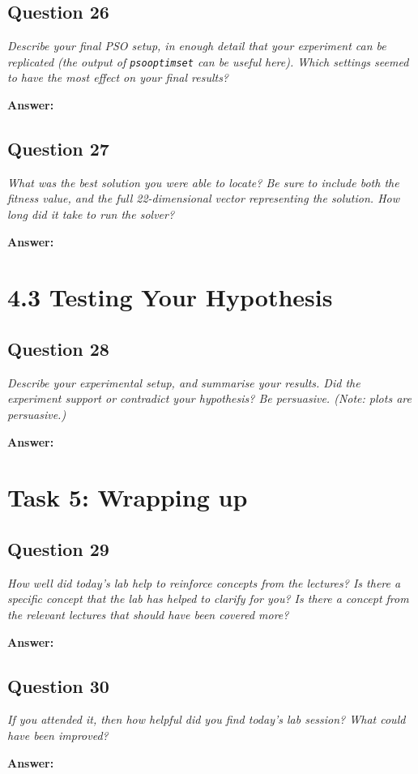 \documentclass[a4paper]{article}
\begin{document}
\subsection*{Question 26}
\emph{Describe your final PSO setup, in enough detail that your experiment can be replicated (the output of \texttt{psooptimset} can be useful here). Which settings seemed to have the most effect on your final results?}

\textbf{Answer:}

\subsection*{Question 27}
\emph{What was the best solution you were able to locate? Be sure to
include both the fitness value, and the full 22-dimensional vector representing the solution. How long did it take to run the solver?}

\textbf{Answer:}

\section*{4.3 Testing Your Hypothesis}

\subsection*{Question 28}
\emph{Describe your experimental setup, and summarise your results.
Did the experiment support or contradict your hypothesis? Be persuasive. (Note: plots are persuasive.)}

\textbf{Answer:}

\section*{Task 5: Wrapping up}

\subsection*{Question 29}
\emph{How well did today's lab help to reinforce concepts from the
lectures? Is there a specific concept that the lab has helped to clarify for you? Is there a concept from the relevant lectures that should have been covered more?}

\textbf{Answer:}

\subsection*{Question 30}
\emph{If you attended it, then how helpful did you find today's lab
session? What could have been improved?}

\textbf{Answer:}
\end{document}
